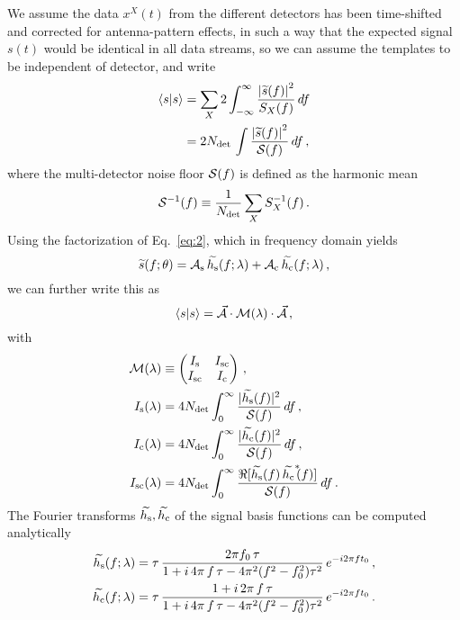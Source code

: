 \documentclass[aps,prd,onecolumn,notitlepage,nofootinbib,superscriptaddress,altaffilletter,floatfix]{revtex4-1}
\begin{document}
We assume the data $x^X(t)$ from the different detectors has been time-shifted and corrected for antenna-pattern effects, in such a way that the
expected signal $s(t)$ would be identical in all data streams, so we can assume the templates to be independent of detector, and write
\begin{align}
  \label{eq:15}
  \langle s|s\rangle &= \sum_X 2\int_{-\infty}^{\infty} \frac{\left| \widetilde{s}(f) \right|^2}{S_X(f)}\,df\\
  &= 2N_{\mathrm{det}}\,\int \frac{\left| \widetilde{s}(f) \right|^2}{\mathcal{S}(f)}\,df\,,
\end{align}
where the multi-detector noise floor $\mathcal{S}(f)$ is defined as the harmonic mean
\begin{equation}
  \label{eq:26}
  \mathcal{S}^{-1}(f) \equiv \frac{1}{N_{\mathrm{det}}}\sum_X S_X^{-1}(f)\,.
\end{equation}
Using the factorization of Eq.~\eqref{eq:2}, which in frequency domain yields
\begin{equation}
  \label{eq:34}
  \widetilde{s}(f;\theta) = \mathcal{A}_{\mathrm{s}}\,\widetilde{h_\mathrm{s}}(f;\lambda) + \mathcal{A}_{\mathrm{c}}\,\widetilde{h_\mathrm{c}}(f;\lambda)\,,
\end{equation}
we can further write this as
\begin{equation}
  \label{eq:36}
  \langle s|s\rangle = \vec{\mathcal{A}} \cdot \mathcal{M}(\lambda) \cdot \vec{\mathcal{A}}\,,
\end{equation}
with
\begin{align}
  \label{eq:35}
  \mathcal{M}(\lambda) &\equiv
  \begin{pmatrix}
    I_{\mathrm{s}}  & I_{\mathrm{sc}} \\
    I_{\mathrm{sc}}  & I_{\mathrm{c}}\\
  \end{pmatrix}\,,\\
  I_{\mathrm{s}}(\lambda) &= 4N_{\mathrm{det}} \int_{0}^{\infty} \frac{|\widetilde{h_\mathrm{s}}(f)|^2}{\mathcal{S}(f)}\,df \,,\\
  I_{\mathrm{c}}(\lambda) &= 4N_{\mathrm{det}} \int_{0}^{\infty} \frac{|\widetilde{h_\mathrm{c}}(f)|^2}{\mathcal{S}(f)}\,df \,,\\
  I_{\mathrm{sc}}(\lambda)&= 4N_{\mathrm{det}} \int_{0}^{\infty} \frac{\Re[\widetilde{h_\mathrm{s}}(f)\,\widetilde{h_\mathrm{c}}^{*}\!\!(f)]}{\mathcal{S}(f)}\,df \,.
\end{align}
The Fourier transforms $\widetilde{h_\mathrm{s}},\widetilde{h_\mathrm{c}}$ of the signal basis functions can be computed analytically
\begin{align}
  \label{eq:37}
  \widetilde{h_\mathrm{s}}(f;\lambda) &= \tau\,\frac{2\pi f_0\,\tau}{1 + i\,4\pi\,f\,\tau -  4\pi^2(f^2 - f_0^2)\tau^2} \, e^{-i2\pi ft_0} \,,\\
  \widetilde{h_\mathrm{c}}(f;\lambda) &= \tau\,\frac{1 + i\,2\pi\,f\,\tau}{1 + i\,4\pi\,f\,\tau - 4\pi^2(f^2 - f_0^2)\tau^2} \, e^{-i2\pi ft_0} \,.
\end{align}
\end{document}
